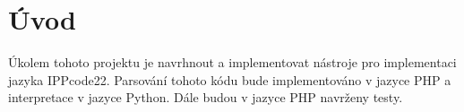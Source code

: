 \section{Úvod}

Úkolem tohoto projektu je navrhnout a implementovat nástroje pro implementaci jazyka IPPcode22.
Parsování tohoto kódu bude implementováno v jazyce PHP a interpretace v jazyce Python.
Dále budou v jazyce PHP navrženy testy.